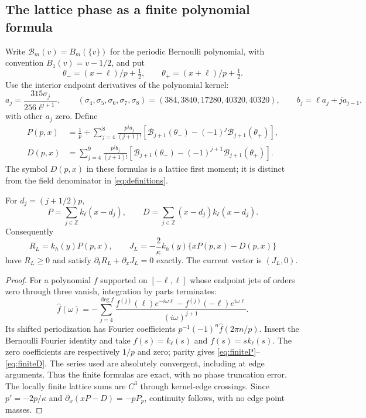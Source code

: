 \subsection{The lattice phase as a finite polynomial formula}
Write $\mathcal B_m(v)=B_m(\{v\})$ for the periodic Bernoulli
polynomial, with convention $B_1(v)=v-1/2$, and put
\[
 \theta_-=(x-\ell)/p+\tfrac12,\qquad
 \theta_+=(x+\ell)/p+\tfrac12.
\]
Use the interior endpoint derivatives of the polynomial kernel:
\begin{equation}
 a_j=\frac{315\sigma_j}{256\ell^{j+1}},\qquad
 (\sigma_4,\sigma_5,\sigma_6,\sigma_7,\sigma_8)
       =(384,3840,17280,40320,40320),\qquad
 b_j=\ell a_j+j a_{j-1},
 \label{eq:phasecoefficients}
\end{equation}
with other $a_j$ zero. Define
\begin{align}
 P(p,x)&=\frac1p+\sum_{j=4}^8\frac{p^ja_j}{(j+1)!}
 [\mathcal B_{j+1}(\theta_-)-(-1)^j\mathcal B_{j+1}(\theta_+)],
 \label{eq:finiteP}\\
 D(p,x)&=\sum_{j=4}^9\frac{p^jb_j}{(j+1)!}
 [\mathcal B_{j+1}(\theta_-)-(-1)^{j+1}\mathcal B_{j+1}(\theta_+)].
 \label{eq:finiteD}
\end{align}
The symbol $D(p,x)$ in these formulas is a lattice first moment;
it is distinct from the field denominator in \eqref{eq:definitions}.

\begin{proposition}\label{prop:phase}
For $d_j=(j+1/2)p$,
\begin{equation}
 P=\sum_{j\in\mathbb Z}k_\ell(x-d_j),\qquad
 D=\sum_{j\in\mathbb Z}(x-d_j)k_\ell(x-d_j).
 \label{eq:latticeidentity}
\end{equation}
Consequently
\begin{equation}
 R_L=k_h(y)P(p,x),\qquad
 J_L=-\frac2\kappa k_h(y)\{xP(p,x)-D(p,x)\}
 \label{eq:explicitcandidate}
\end{equation}
have $R_L\ge0$ and satisfy $\partial_tR_L+\partial_xJ_L=0$
exactly. The current vector is $(J_L,0)$.
\end{proposition}
\begin{proof}
For a polynomial $f$ supported on $[-\ell,\ell]$ whose endpoint
jets of orders zero through three vanish, integration by parts terminates:
\[
 \widehat f(\omega)=-\sum_{j=4}^{\deg f}
 \frac{f^{(j)}(\ell)e^{-i\omega\ell}
             -f^{(j)}(-\ell)e^{i\omega\ell}}{(i\omega)^{j+1}}.
\]
Its shifted periodization has Fourier coefficients
$p^{-1}(-1)^n\widehat f(2\pi n/p)$.
Insert the Bernoulli Fourier identity \cite{dlmf24} and take
$f(s)=k_\ell(s)$ and $f(s)=sk_\ell(s)$.
The zero coefficients are respectively $1/p$ and zero; parity gives
\eqref{eq:finiteP}--\eqref{eq:finiteD}.
The series used are absolutely convergent, including at edge arguments.
Thus the finite formulas are exact, with no phase truncation error.
The locally finite lattice sums are $C^3$ through kernel-edge crossings.
Since $p'=-2p/\kappa$ and
$\partial_x(xP-D)=-pP_p$, continuity follows, with no edge point masses.
\end{proof}

